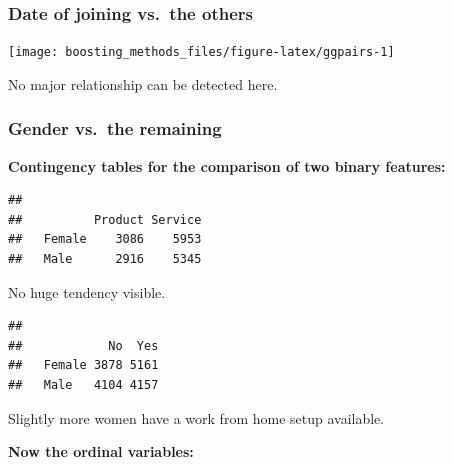 \documentclass[
]{book}
\newenvironment{Shaded}{\begin{snugshade}}{\end{snugshade}}
\newcommand{\CommentTok}[1]{\textcolor[rgb]{0.56,0.35,0.01}{\textit{#1}}}
\newcommand{\FunctionTok}[1]{\textcolor[rgb]{0.00,0.00,0.00}{#1}}
\newcommand{\NormalTok}[1]{#1}
\newcommand{\SpecialCharTok}[1]{\textcolor[rgb]{0.00,0.00,0.00}{#1}}
\begin{document}
\hypertarget{date-of-joining-vs.-the-others}{%
\subsubsection{Date of joining vs.~the others}\label{date-of-joining-vs.-the-others}}

\texttt{[image: boosting\_methods\_files/figure-latex/ggpairs-1]}

No major relationship can be detected here.

\hypertarget{gender-vs.-the-remaining}{%
\subsubsection{Gender vs.~the remaining}\label{gender-vs.-the-remaining}}

\textbf{Contingency tables for the comparison of two binary features:}

\begin{Shaded}
\end{Shaded}

\begin{verbatim}
##         
##          Product Service
##   Female    3086    5953
##   Male      2916    5345
\end{verbatim}

No huge tendency visible.

\begin{Shaded}
\end{Shaded}

\begin{verbatim}
##         
##            No  Yes
##   Female 3878 5161
##   Male   4104 4157
\end{verbatim}

Slightly more women have a work from home setup available.

\textbf{Now the ordinal variables:}
\end{document}
